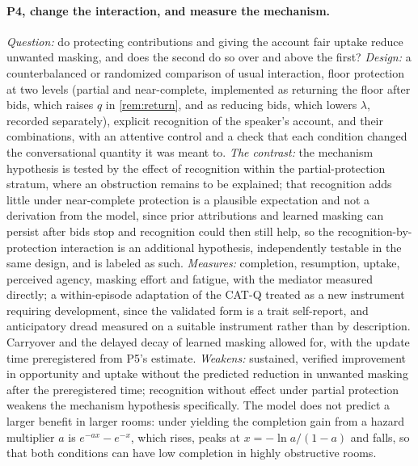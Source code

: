 \paragraph{P4, change the interaction, and measure the mechanism.} \emph{Question:} do protecting contributions and giving the account fair uptake reduce unwanted masking, and does the second do so over and above the first? \emph{Design:} a counterbalanced or randomized comparison of usual interaction, floor protection at two levels (partial and near-complete, implemented as returning the floor after bids, which raises $q$ in \autoref{rem:return}, and as reducing bids, which lowers $\lambda$, recorded separately), explicit recognition of the speaker's account, and their combinations, with an attentive control and a check that each condition changed the conversational quantity it was meant to. \emph{The contrast:} the mechanism hypothesis is tested by the effect of recognition within the partial-protection stratum, where an obstruction remains to be explained; that recognition adds little under near-complete protection is a plausible expectation and not a derivation from the model, since prior attributions and learned masking can persist after bids stop and recognition could then still help, so the recognition-by-protection interaction is an additional hypothesis, independently testable in the same design, and is labeled as such. \emph{Measures:} completion, resumption, uptake, perceived agency, masking effort and fatigue, with the mediator measured directly; a within-episode adaptation of the CAT-Q \cite{Hull2019} treated as a new instrument requiring development, since the validated form is a trait self-report, and anticipatory dread measured on a suitable instrument rather than by description. Carryover and the delayed decay of learned masking allowed for, with the update time preregistered from P5's estimate. \emph{Weakens:} sustained, verified improvement in opportunity and uptake without the predicted reduction in unwanted masking after the preregistered time; recognition without effect under partial protection weakens the mechanism hypothesis specifically. The model does not predict a larger benefit in larger rooms: under yielding the completion gain from a hazard multiplier $a$ is $e^{-ax} - e^{-x}$, which rises, peaks at $x = -\ln a/(1-a)$ and falls, so that both conditions can have low completion in highly obstructive rooms.

